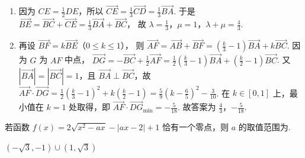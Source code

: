 \begin{solution}
\begin{enumerate}
\item
因为 \(CE=\frac12DE\)，所以
\(\overrightarrow{CE}=\frac13\overrightarrow{CD}=\frac13\overrightarrow{BA}\).
于是
\(\overrightarrow{BE} =\overrightarrow{BC}+\overrightarrow{CE} =\frac13\overrightarrow{BA}+\overrightarrow{BC}\)，
故
\(\lambda=\frac13\)，\(\mu=1\)，\(\lambda+\mu=\frac43\).

\item
再设
\(\overrightarrow{BF}=k\overrightarrow{BE}\)（\(0\le k\le 1\)），
则
\(\overrightarrow{AF} =\overrightarrow{AB}+\overrightarrow{BF} =\left(\frac{k}{3}-1\right)\overrightarrow{BA}+k\overrightarrow{BC}\).
因为 \(G\) 为 \(AF\) 中点，
\(\overrightarrow{DG}=-\overrightarrow{BC}+\frac12\overrightarrow{AF}=\frac12\left(\frac{k}{3}-1\right)\overrightarrow{BA}+\left(\frac{k}{2}-1\right)\overrightarrow{BC}\).
又 \(|\overrightarrow{BA}|=|\overrightarrow{BC}|=1\)，且 \(\overrightarrow{BA}\perp \overrightarrow{BC}\)，故
\(\overrightarrow{AF}\cdot \overrightarrow{DG}=\frac12\left(\frac{k}{3}-1\right)^2+k\left(\frac{k}{2}-1\right)=\frac59\left(k-\frac65\right)^2-\frac{3}{10}\).
在 \(k\in[0,1]\) 上，最小值在 \(k=1\) 处取得，即
\(\overrightarrow{AF}\cdot \overrightarrow{DG}_{\min}=-\frac{5}{18}\).
故答案为 \(\frac43\)，\(-\frac{5}{18}\).
\end{enumerate}
\end{solution}

\begin{problem}
若函数 \(f(x)=2\sqrt{x^2-ax}-|ax-2|+1\) 恰有一个零点，则 \(a\) 的取值范围为\fillinblank{}.
\end{problem}

\begin{answer}
\((-\sqrt{3},-1)\cup(1,\sqrt{3})\)
\end{answer}

